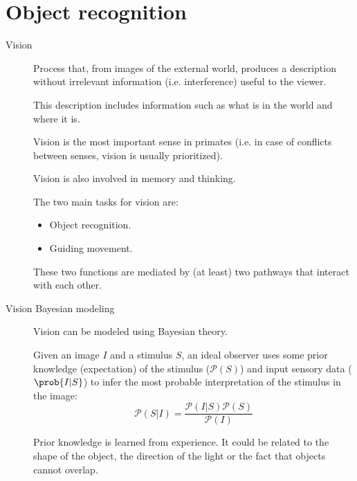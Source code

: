 \chapter{Object recognition}


\begin{description}
    \item[Vision] 
        Process that, from images of the external world, 
        produces a description without irrelevant information (i.e. interference) useful to the viewer.

        This description includes information such as what is in the world and where it is.

        \begin{remark}
            Vision is the most important sense in primates (i.e. in case of conflicts between senses, vision is usually prioritized).
        \end{remark}

        \begin{remark}
            Vision is also involved in memory and thinking.
        \end{remark}

        \begin{remark}
            The two main tasks for vision are:
            \begin{itemize}
                \item Object recognition.
                \item Guiding movement.
            \end{itemize}
            These two functions are mediated by (at least) two pathways that interact with each other.
        \end{remark}


    \item[Vision Bayesian modeling] 
        Vision can be modeled using Bayesian theory.
        
        Given an image $I$ and a stimulus $S$, an ideal observer uses some prior knowledge (expectation) of the stimulus ($\mathcal{P}(S)$)
        and input sensory data ($\prob{I | S}$) to infer the most probable interpretation of the stimulus in the image:
        \[ \mathcal{P}(S | I) = \frac{\mathcal{P}(I | S) \mathcal{P}(S)}{\mathcal{P}(I)} \]

        \begin{remark}
            Prior knowledge is learned from experience. 
            It could be related to the shape of the object, the direction of the light or the fact that objects cannot overlap.
        \end{remark}


\end{description}
